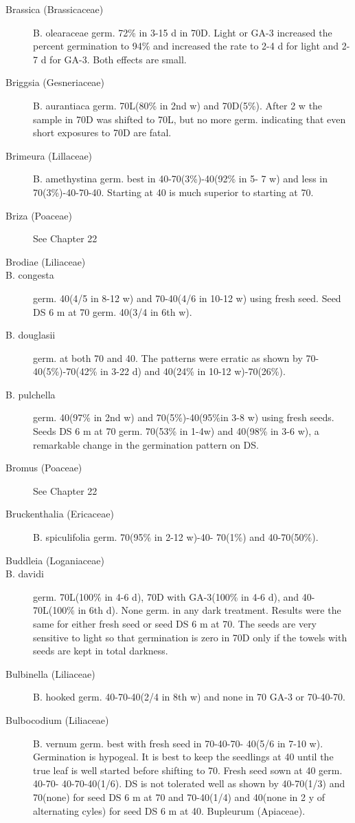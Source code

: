 \begin{description}
\item[Brassica (Brassicaceae)] B. olearaceae germ. 72\% in 3-15 d in 70D. Light
or GA-3 increased the percent germination to 94\% and increased the rate to 2-4 d for
light and 2-7 d for GA-3. Both effects are small.
\item[Briggsia (Gesneriaceae)] B. aurantiaca germ. 70L(80\% in 2nd w) and
70D(5\%). After 2 w the sample in 70D was shifted to 70L, but no more germ.
indicating that even short exposures to 70D are fatal.
\item[Brimeura (Lillaceae)] B. amethystina germ. best in 40-70(3\%)-40(92\% in 5-
7 w) and less in 70(3\%)-40-70-40. Starting at 40 is much superior to starting at 70.

\item[Briza (Poaceae)] See Chapter 22
\item[Brodiae (Liliaceae)]
\item[B. congesta] germ. 40(4/5 in 8-12 w) and 70-40(4/6 in 10-12 w) using fresh
seed. Seed DS 6 m at 70 germ. 40(3/4 in 6th w).
\item[B. douglasii] germ. at both 70 and 40. The patterns were erratic as shown by 70-
40(5\%)-70(42\% in 3-22 d) and 40(24\% in 10-12 w)-70(26\%).
\item[B. pulchella] germ. 40(97\% in 2nd w) and 70(5\%)-40(95\%in 3-8 w) using fresh
seeds. Seeds DS 6 m at 70 germ. 70(53\% in 1-4w) and 40(98\% in 3-6 w), a
remarkable change in the germination pattern on DS.

\item[Bromus (Poaceae)] See Chapter 22
\item[Bruckenthalia (Ericaceae)] B. spiculifolia germ. 70(95\% in 2-12 w)-40-
70(1\%) and 40-70(50\%).

\item[Buddleia (Loganiaceae)]
\item[B. davidi] germ. 70L(100\% in 4-6 d), 70D with GA-3(100\% in 4-6 d), and 40-
70L(100\% in 6th d). None germ. in any dark treatment. Results were the same for
either fresh seed or seed DS 6 m at 70. The seeds are very sensitive to light so that
germination is zero in 70D only if the towels with seeds are kept in total darkness.

\item[Bulbinella (Liliaceae)] B. hooked germ. 40-70-40(2/4 in 8th w) and none in
70 GA-3 or 70-40-70.

\item[Bulbocodium (Liliaceae)] B. vernum germ. best with fresh seed in 70-40-70-
40(5/6 in 7-10 w). Germination is hypogeal. It is best to keep the seedlings at 40 until
the true leaf is well started before shifting to 70. Fresh seed sown at 40 germ. 40-70-
40-70-40(1/6). DS is not tolerated well as shown by 40-70(1/3) and 70(none) for seed
DS 6 m at 70 and 70-40(1/4) and 40(none in 2 y of alternating cyles) for seed DS 6 m
at 40. Bupleurum (Apiaceae).


\end{description}
